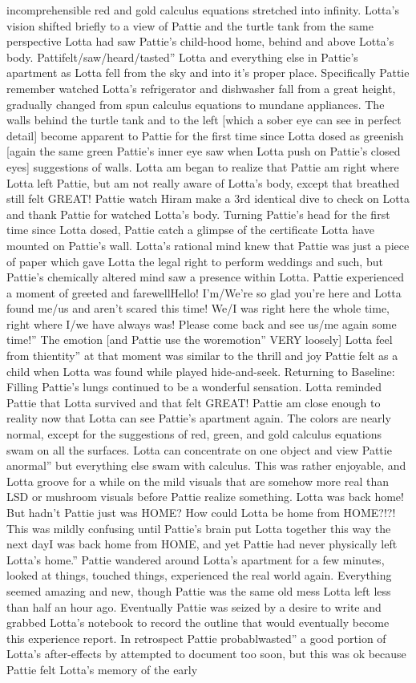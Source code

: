 \documentclass[12pt]{book}
\begin{document}
incomprehensible red and gold calculus equations stretched into infinity. Lotta's vision shifted briefly to a view of Pattie and the turtle tank from the same perspective Lotta had saw Pattie's child-hood home, behind and above Lotta's body. Pattifelt/saw/heard/tasted'' Lotta and everything else in Pattie's apartment as Lotta fell from the sky and into it's proper place. Specifically Pattie remember watched Lotta's refrigerator and dishwasher fall from a great height, gradually changed from spun calculus equations to mundane appliances. The walls behind the turtle tank and to the left [which a sober eye can see in perfect detail] become apparent to Pattie for the first time since Lotta dosed as greenish [again the same green Pattie's inner eye saw when Lotta push on Pattie's closed eyes] suggestions of walls. Lotta am began to realize that Pattie am right where Lotta left Pattie, but am not really aware of Lotta's body, except that breathed still felt GREAT! Pattie watch Hiram make a 3rd identical dive to check on Lotta and thank Pattie for watched Lotta's body. Turning Pattie's head for the first time since Lotta dosed, Pattie catch a glimpse of the certificate Lotta have mounted on Pattie's wall. Lotta's rational mind knew that Pattie was just a piece of paper which gave Lotta the legal right to perform weddings and such, but Pattie's chemically altered mind saw a presence within Lotta. Pattie experienced a moment of greeted and farewellHello! I'm/We're so glad you're here and Lotta found me/us and aren't scared this time! We/I was right here the whole time, right where I/we have always was! Please come back and see us/me again some time!'' The emotion [and Pattie use the woremotion'' VERY loosely] Lotta feel from thientity'' at that moment was similar to the thrill and joy Pattie felt as a child when Lotta was found while played hide-and-seek. Returning to Baseline: Filling Pattie's lungs continued to be a wonderful sensation. Lotta reminded Pattie that Lotta survived and that felt GREAT! Pattie am close enough to reality now that Lotta can see Pattie's apartment again. The colors are nearly normal, except for the suggestions of red, green, and gold calculus equations swam on all the surfaces. Lotta can concentrate on one object and view Pattie anormal'' but everything else swam with calculus. This was rather enjoyable, and Lotta groove for a while on the mild visuals that are somehow more real than LSD or mushroom visuals before Pattie realize something. Lotta was back home! But hadn't Pattie just was HOME? How could Lotta be home from HOME?!?! This was mildly confusing until Pattie's brain put Lotta together this way the next dayI was back home from HOME, and yet Pattie had never physically left Lotta's home.'' Pattie wandered around Lotta's apartment for a few minutes, looked at things, touched things, experienced the real world again. Everything seemed amazing and new, though Pattie was the same old mess Lotta left less than half an hour ago. Eventually Pattie was seized by a desire to write and grabbed Lotta's notebook to record the outline that would eventually become this experience report. In retrospect Pattie probablwasted'' a good portion of Lotta's after-effects by attempted to document too soon, but this was ok because Pattie felt Lotta's memory of the early 
\end{document}
